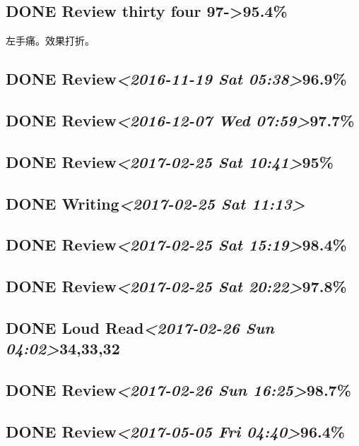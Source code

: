 \documentclass[11pt]{ctexart}
\begin{document}
\subsection{{\bfseries\sffamily DONE} Review thirty four 97->95.4\%}
\label{sec:org542680f}
左手痛。效果打折。

\subsection{{\bfseries\sffamily DONE} Review\textit{<2016-11-19 Sat 05:38>}96.9\%}
\label{sec:orgb95eb7f}
\subsection{{\bfseries\sffamily DONE} Review\textit{<2016-12-07 Wed 07:59>}97.7\%}
\label{sec:orgd24a41d}
\subsection{{\bfseries\sffamily DONE} Review\textit{<2017-02-25 Sat 10:41>}95\%}
\label{sec:org6009f4a}
\subsection{{\bfseries\sffamily DONE} Writing\textit{<2017-02-25 Sat 11:13>}}
\label{sec:orgef77a50}
\subsection{{\bfseries\sffamily DONE} Review\textit{<2017-02-25 Sat 15:19>}98.4\%}
\label{sec:org08ce144}
\subsection{{\bfseries\sffamily DONE} Review\textit{<2017-02-25 Sat 20:22>}97.8\%}
\label{sec:org194efcb}
\subsection{{\bfseries\sffamily DONE} Loud Read\textit{<2017-02-26 Sun 04:02>}34,33,32}
\label{sec:orge789bd6}
\subsection{{\bfseries\sffamily DONE} Review\textit{<2017-02-26 Sun 16:25>}98.7\%}
\label{sec:org7cda42f}
\subsection{{\bfseries\sffamily DONE} Review\textit{<2017-05-05 Fri 04:40>}96.4\%}
\label{sec:org967e4ff}
\end{document}

